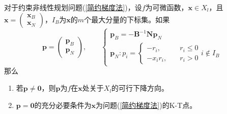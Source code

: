 \documentclass[lang = cn, scheme = chinese, thmcnt = section]{elegantbook}
\newcommand{\bs}{\boldsymbol}          %
\begin{document}
\begin{theorem}
	对于约束非线性规划问题(\ref{简约梯度法})，设$f$为可微函数，$\bs{x}\in X_l$，且$\bs{x}=\begin{pmatrix}\bs{x}_B\\\bs{x}_N\end{pmatrix}$，$I_B$为$\bs{x}$的$m$个最大分量的下标集。如果
	$$
	\bs{p}=\begin{pmatrix}
		\bs{p}_B\\
		\bs{p}_N
	\end{pmatrix},\qquad 
	\begin{cases}
		\bs{p}_B=-\bs{B}^{-1}\bs{N}\bs{p}_N\\
		\bs{p}_N:p_i=\begin{cases}
			-r_i,\quad & r_i\le 0\\
			-x_ir_i,\quad & r_i>0
		\end{cases}i\notin I_B
	\end{cases}
	$$
	那么
	\begin{enumerate}
		\item 若$\bs{p}\ne\bs{0}$，则$\bs{p}$为$f$在$\bs{x}$处关于$X_l$的可行下降方向。
		\item $\bs{p}=\bs{0}$的充分必要条件为$\bs{x}$为问题(\ref{简约梯度法})的K-T点。
	\end{enumerate}
\end{theorem}
\end{document}
